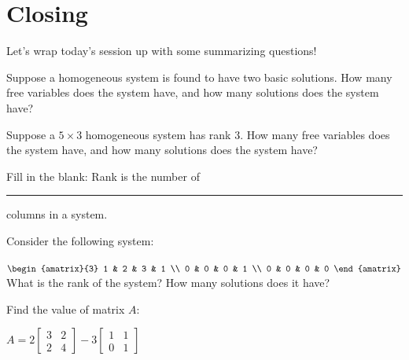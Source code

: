 \documentclass[11pt]{exam}
\begin{document}
    \section{Closing}
    Let's wrap today's session up with some summarizing questions!
    \begin{questions}
        \item Suppose a homogeneous system is found to have two basic solutions. How many free variables does the system have, and how many
        solutions does the system have?
        \item Suppose a $5 \times 3$ homogeneous system has rank 3. How many free variables does the system have, and how many
        solutions does the system have?
        \item Fill in the blank: Rank is the number of \rule{5mm}{0.15mm} columns in a system.

        \item Consider the following system:

        $\begin{amatrix}{3}
            1 & 2 & 3 & 1 \\
            0 & 0 & 0 & 1 \\
            0 & 0 & 0 & 0
        \end{amatrix}$ \\

        What is the rank of the system? How many solutions does it have?

        \item Find the value of matrix $A$:
        
        $A = 2 \begin{bmatrix} 3 & 2 \\ 2 & 4 \end{bmatrix} - 3 \begin{bmatrix} 1 & 1 \\ 0 & 1 \end{bmatrix}$
    \end{questions}
\end{document}
